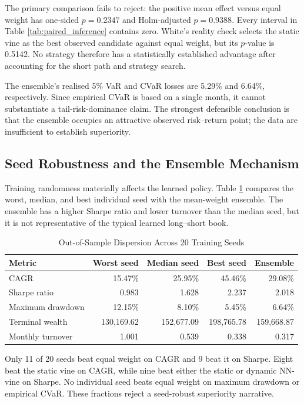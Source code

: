 The primary comparison fails to reject: the positive mean effect versus equal weight has one-sided $p=0.2347$ and Holm-adjusted $p=0.9388$. Every interval in Table \ref{tab:paired_inference} contains zero. White's reality check selects the static vine as the best observed candidate against equal weight, but its $p$-value is 0.5142. No strategy therefore has a statistically established advantage after accounting for the short path and strategy search.

The ensemble's realised 5\% VaR and CVaR losses are 5.29\% and 6.64\%, respectively. Since empirical CVaR is based on a single month, it cannot substantiate a tail-risk-dominance claim. The strongest defensible conclusion is that the ensemble occupies an attractive observed risk--return point; the data are insufficient to establish superiority.

\subsection{Seed Robustness and the Ensemble Mechanism}
\label{subsec:4_seed_robustness}

Training randomness materially affects the learned policy. Table \ref{tab:seed_robustness} compares the worst, median, and best individual seed with the mean-weight ensemble. The ensemble has a higher Sharpe ratio and lower turnover than the median seed, but it is not representative of the typical learned long--short book.

\begin{table}[H]
\centering
\caption{Out-of-Sample Dispersion Across 20 Training Seeds}
\label{tab:seed_robustness}
\begin{tabular}{l r r r r}
\toprule
\textbf{Metric} & \textbf{Worst seed} & \textbf{Median seed} & \textbf{Best seed} & \textbf{Ensemble} \\
\midrule
CAGR & 15.47\% & 25.95\% & 45.46\% & 29.08\% \\
Sharpe ratio & 0.983 & 1.628 & 2.237 & 2.018 \\
Maximum drawdown & 12.15\% & 8.10\% & 5.45\% & 6.64\% \\
Terminal wealth & 130,169.62 & 152,677.09 & 198,765.78 & 159,668.87 \\
Monthly turnover & 1.001 & 0.539 & 0.338 & 0.317 \\
\bottomrule
\end{tabular}
\end{table}

Only 11 of 20 seeds beat equal weight on CAGR and 9 beat it on Sharpe. Eight beat the static vine on CAGR, while nine beat either the static or dynamic NN-vine on Sharpe. No individual seed beats equal weight on maximum drawdown or empirical CVaR. These fractions reject a seed-robust superiority narrative.

